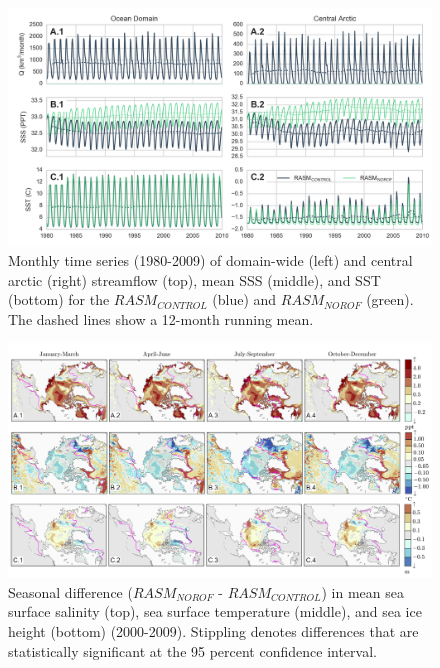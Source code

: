\documentclass[jgrga, draft]{agutex}
\begin{document}
\clearpage
\begin{figure}
\noindent\includegraphics[width=40pc,natwidth=1]{ocean_combine_ts}
\caption{Monthly time series (1980-2009) of domain-wide (left) and central arctic (right) streamflow (top), mean SSS (middle), and SST (bottom) for the $RASM_{CONTROL}$ (blue) and $RASM_{NOROF}$ (green). The dashed lines show a 12-month running mean.}
\label{fig:ocean_timeseries}
\end{figure}

\clearpage
\begin{figure}
\noindent\includegraphics[width=40pc,natwidth=1]{ocean_combine}
\caption{Seasonal difference ($RASM_{NOROF}$ - $RASM_{CONTROL}$) in mean sea surface salinity (top), sea surface temperature (middle), and sea ice height (bottom) (2000-2009). Stippling denotes differences that are statistically significant at the 95 percent confidence interval.}
\label{fig:ocean_maps}
\end{figure}

\clearpage
\end{document}
